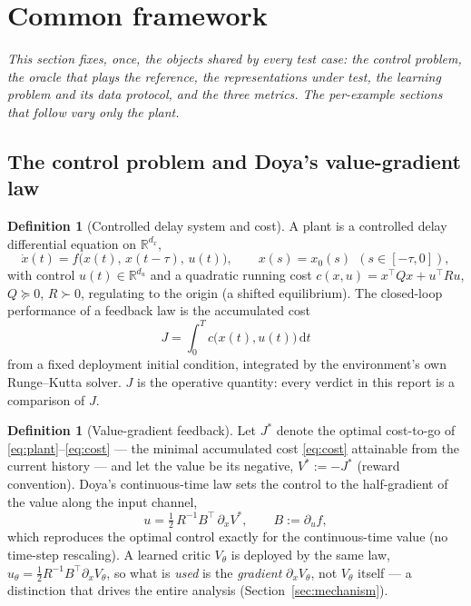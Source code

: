 \documentclass[11pt]{article}
\renewcommand{\_}{\discretionary{\textunderscore}{}{\textunderscore}}
\theoremstyle{plain}
\theoremstyle{definition}
\newtheorem{definition}[theorem]{Definition}
\newcommand{\R}{\mathbb{R}}
\newcommand{\half}{\tfrac12}
\begin{document}
{\small\tableofcontents}

\section{Common framework}\label{sec:framework}

\emph{This section fixes, once, the objects shared by every test case: the control problem,
the oracle that plays the reference, the representations under test, the learning problem and
its data protocol, and the three metrics. The per-example sections that follow vary only the
plant.}

\subsection{The control problem and Doya's value-gradient law}

\begin{definition}[Controlled delay system and cost]\label{def:plant}
A plant is a controlled delay differential equation on $\R^{d_x}$,
\begin{equation}\label{eq:plant}
\dot x(t)=f\big(x(t),\,x(t-\tau),\,u(t)\big),\qquad x(s)=x_{0}(s)\ \ (s\in[-\tau,0]),
\end{equation}
with control $u(t)\in\R^{d_u}$ and a quadratic running cost
$c(x,u)=x^{\top}Qx+u^{\top}Ru$, $Q\succeq0$, $R\succ0$, regulating to the origin (a shifted
equilibrium). The closed-loop performance of a feedback law is the accumulated cost
\begin{equation}\label{eq:cost}
J=\int_{0}^{T}c\big(x(t),u(t)\big)\,\mathrm dt
\end{equation}
from a fixed deployment initial condition, integrated by the environment's own Runge--Kutta
solver. $J$ is the operative quantity: every verdict in this report is a comparison of $J$.
\end{definition}

\begin{definition}[Value-gradient feedback]\label{def:doya}
Let $J^{\ast}$ denote the optimal cost-to-go of \eqref{eq:plant}--\eqref{eq:cost} --- the minimal
accumulated cost \eqref{eq:cost} attainable from the current history --- and let the value be its
negative, $V^{\ast}:=-J^{\ast}$ (reward convention). Doya's continuous-time law sets the
control to the half-gradient of the value along the input channel,
\begin{equation}\label{eq:doyalaw}
u=\half\,R^{-1}B^{\top}\,\partial_{x}V^{\ast},\qquad B:=\partial_{u}f,
\end{equation}
which reproduces the optimal control exactly for the continuous-time value (no time-step
rescaling). A learned critic $V_{\theta}$ is deployed by the same law,
$u_{\theta}=\half R^{-1}B^{\top}\partial_{x}V_{\theta}$, so what is \emph{used} is the
\emph{gradient} $\partial_{x}V_{\theta}$, not $V_{\theta}$ itself --- a distinction that drives
the entire analysis (Section~\ref{sec:mechanism}).
\end{definition}
\end{document}
